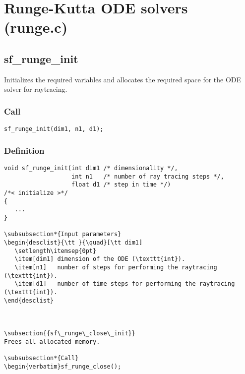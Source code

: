 \section{Runge-Kutta ODE solvers (runge.c)}




\subsection{{sf\_runge\_init}}
Initializes the required variables and allocates the required space for the ODE solver for raytracing.

\subsubsection*{Call}
\begin{verbatim}sf_runge_init(dim1, n1, d1);\end{verbatim}

\subsubsection*{Definition}
\begin{verbatim}
void sf_runge_init(int dim1 /* dimensionality */, 
                   int n1   /* number of ray tracing steps */, 
                   float d1 /* step in time */)
/*< initialize >*/
{
   ...
}

\subsubsection*{Input parameters}
\begin{desclist}{\tt }{\quad}[\tt dim1]
   \setlength\itemsep{0pt}
   \item[dim1] dimension of the ODE (\texttt{int}). 
   \item[n1]   number of steps for performing the raytracing (\texttt{int}).  
   \item[d1]   number of time steps for performing the raytracing (\texttt{int}).  
\end{desclist}



\subsection{{sf\_runge\_close\_init}}
Frees all allocated memory.

\subsubsection*{Call}
\begin{verbatim}sf_runge_close();\end{verbatim}

